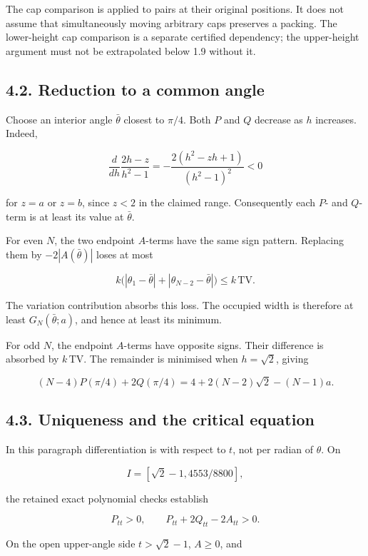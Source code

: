 \documentclass[
  11pt,
  a4paper,
]{article}
\begin{document}
The cap comparison is applied to pairs at their original positions. It
does not assume that simultaneously moving arbitrary caps preserves a
packing. The lower-height cap comparison is a separate certified
dependency; the upper-height argument must not be extrapolated below 1.9
without it.

\subsection{4.2. Reduction to a common
angle}\label{reduction-to-a-common-angle}

Choose an interior angle \(\bar\theta\) closest to \(\pi/4\). Both \(P\)
and \(Q\) decrease as \(h\) increases. Indeed,

\[
\frac{d}{dh}\frac{2h-z}{h^2-1}
=-\frac{2(h^2-zh+1)}{(h^2-1)^2}<0
\]

for \(z=a\) or \(z=b\), since \(z<2\) in the claimed range. Consequently
each \(P\)- and \(Q\)-term is at least its value at \(\bar\theta\).

For even \(N\), the two endpoint \(A\)-terms have the same sign pattern.
Replacing them by \(-2|A(\bar\theta)|\) loses at most

\[
k\bigl(|\theta_1-\bar\theta|+|\theta_{N-2}-\bar\theta|\bigr)
\le k\,\mathrm{TV}.
\]

The variation contribution absorbs this loss. The occupied width is
therefore at least \(G_N(\bar\theta;a)\), and hence at least its
minimum.

For odd \(N\), the endpoint \(A\)-terms have opposite signs. Their
difference is absorbed by \(k\,\mathrm{TV}\). The remainder is minimised
when \(h=\sqrt2\), giving

\[
(N-4)P(\pi/4)+2Q(\pi/4)
=4+2(N-2)\sqrt2-(N-1)a.
\]

\subsection{4.3. Uniqueness and the critical
equation}\label{uniqueness-and-the-critical-equation}

In this paragraph differentiation is with respect to \textbf{\(t\)}, not
per radian of \(\theta\). On

\[
I=[\sqrt2-1,4553/8800],
\]

the retained exact polynomial checks establish

\[
P_{tt}>0,\qquad P_{tt}+2Q_{tt}-2A_{tt}>0.
\]

On the open upper-angle side \(t>\sqrt2-1\), \(A\ge0\), and
\end{document}
